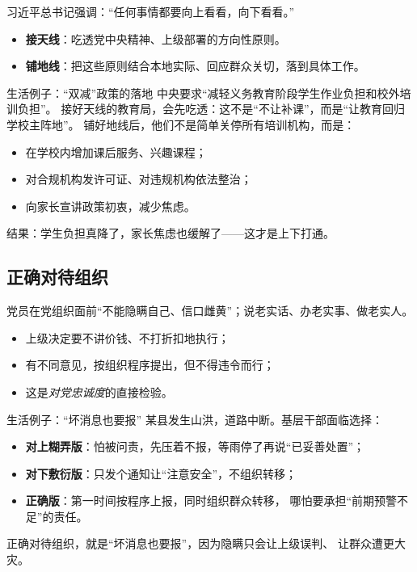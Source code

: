 \documentclass[11pt,a4paper]{ctexart}
\begin{document}
\begin{quoteblock}
习近平总书记强调：``任何事情都要向上看看，向下看看。''
\end{quoteblock}

\begin{actionblock}
\begin{itemize}
  \item \textbf{接天线}：吃透党中央精神、上级部署的方向性原则。
  \item \textbf{铺地线}：把这些原则结合本地实际、回应群众关切，落到具体工作。
\end{itemize}
\end{actionblock}

\begin{exampleblock}{生活例子：``双减''政策的落地}
中央要求``减轻义务教育阶段学生作业负担和校外培训负担''。
接好天线的教育局，会先吃透：这不是``不让补课''，而是``让教育回归学校主阵地''。
铺好地线后，他们不是简单关停所有培训机构，而是：
\begin{itemize}
  \item 在学校内增加课后服务、兴趣课程；
  \item 对合规机构发许可证、对违规机构依法整治；
  \item 向家长宣讲政策初衷，减少焦虑。
\end{itemize}
结果：学生负担真降了，家长焦虑也缓解了——这才是上下打通。
\end{exampleblock}

\subsection{正确对待组织}

\begin{quoteblock}
党员在党组织面前``不能隐瞒自己、信口雌黄''；说老实话、办老实事、做老实人。
\end{quoteblock}

\begin{actionblock}
\begin{itemize}
  \item 上级决定要不讲价钱、不打折扣地执行；
  \item 有不同意见，按组织程序提出，但不得违令而行；
  \item 这是\emph{对党忠诚度}的直接检验。
\end{itemize}
\end{actionblock}

\begin{exampleblock}{生活例子：``坏消息也要报''}
某县发生山洪，道路中断。基层干部面临选择：
\begin{itemize}
  \item \textbf{对上糊弄版}：怕被问责，先压着不报，等雨停了再说``已妥善处置''；
  \item \textbf{对下敷衍版}：只发个通知让``注意安全''，不组织转移；
  \item \textbf{正确版}：第一时间按程序上报，同时组织群众转移，
        哪怕要承担``前期预警不足''的责任。
\end{itemize}
正确对待组织，就是``坏消息也要报''，因为隐瞒只会让上级误判、
让群众遭更大灾。
\end{exampleblock}
\end{document}
